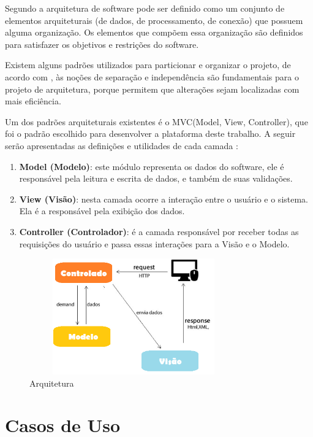 Segundo \citep{Perry1992} a arquitetura de software pode ser definido como um conjunto de elementos arquiteturais (de dados, de processamento, de conexão) que possuem alguma organização. Os elementos que compõem essa organização são definidos para satisfazer os objetivos e restrições do software.

Existem alguns padrões utilizados para particionar e organizar o projeto, de acordo com \citep{SOMMERVILLE2011}, às noções de separação e independência são fundamentais para o projeto de arquitetura, porque permitem que alterações sejam localizadas com mais eficiência.

Um dos padrões arquiteturais existentes é o MVC(Model, View, Controller), que foi o padrão escolhido para desenvolver a plataforma deste trabalho. A seguir serão apresentadas as definições e utilidades de cada camada \citep{SOMMERVILLE2011}:

\begin{enumerate}
\item \textbf{Model (Modelo)}: este módulo representa os dados do software, ele é responsável pela leitura e escrita de dados, e também de suas validações.
\item \textbf{View (Visão)}: nesta camada ocorre a interação entre o usuário e o sistema. Ela é a responsável pela exibição dos dados.
\item \textbf{Controller (Controlador)}: é a camada responsável por receber todas as requisições do usuário e passa essas interações para a Visão e o Modelo.
\end{enumerate}

\begin{figure}[htp]
\begin{center}
  \includegraphics[width=9cm, height=5cm]{images/proposta-img/Figura4-1.png}
  \caption{Arquitetura}
  \label{fig:Figura4-1}
\end{center}
\end{figure}


\section{Casos de Uso}
\label{sc:casosDeUso}

